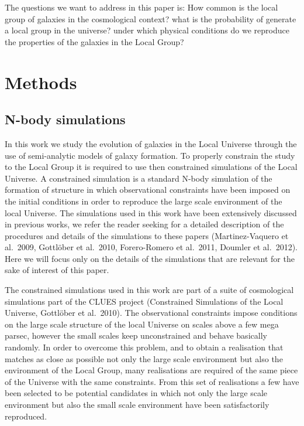 \documentclass[useAMS,usenatbib]{mn2e}
\newcommand{\etal}{et al.~}
\begin{document}
The questions we want to address in this paper is: How common is the
local group of galaxies in the cosmological context? what is the
probability of generate a local group in the universe? under which
physical conditions do we reproduce the properties of the galaxies in
the Local Group?





\section{Methods} 
\label{sec:method}

\subsection{N-body simulations}
\label{sec:simul}

In this work we study the evolution of galaxies in the Local Universe
through the use of semi-analytic models of galaxy formation. To
properly constrain the study to the Local Group it is required to use
then constrained simulations of the Local Universe. A constrained
simulation is a standard N-body simulation of the formation of
structure in which observational constraints have been imposed on the
initial conditions in order to reproduce the large scale environment
of the local Universe. The simulations used in this work have been
extensively discussed in previous works, we refer the reader seeking
for a detailed description of the procedures and details of the
simulations to these papers (Martinez-Vaquero \etal 2009, Gottl\"{o}ber
\etal 2010, Forero-Romero \etal 2011, Doumler \etal 2012). Here we
will focus only on the details of the simulations that are relevant
for the sake of interest of this paper.

The constrained simulations used in this work are part of a suite of
cosmological simulations part of the CLUES project (Constrained
Simulations of the Local Universe, Gottl\"{o}ber \etal 2010). The
observational constraints impose conditions on the large scale
structure of the local Universe on scales above a few mega parsec,
however the small scales keep unconstrained and behave basically
randomly. In order to overcome this problem, and to obtain a
realisation that matches as close as possible not only the large scale
environment but also the environment of the Local Group, many
realisations are required of the same piece of the Universe with the
same constraints. From this set of realisations a few have been
selected to be potential candidates in which not only the large scale
environment but also the small scale environment have been
satisfactorily reproduced.
\end{document}
